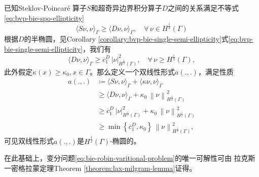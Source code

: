 已知Steklov-Poincaré 算子$S$和超奇异边界积分算子$D$之间的关系满足不等式\eqref{eq:bvp-bie-spo-ellipticity}
\begin{equation*}
  \langle S \nu, \nu \rangle_{\Gamma} \ge \langle D \nu, \nu \rangle_{\Gamma}, \quad \forall \, \nu \in H^{\frac{1}{2}}( \Gamma )
\end{equation*}
根据$D$的半椭圆，见Corollary \ref{corollary:bvp-bie-single-semi-ellipticity}式\eqref{eq:bvp-bie-single-semi-ellipticity}，我们有
\begin{equation*}
  \langle D \nu, \nu \rangle_{\Gamma} \ge \overline{c}_{1}^{D} \,
  \left| \nu \right|_{H^{\frac{1}{2}}(\Gamma)}^{2}, \quad \forall \, \nu \ge H^{\frac{1}{2}}(\Gamma),
\end{equation*}
此外假定$\kappa(x) \ge \kappa_{0}, x \in \Gamma$。那么定义一个双线性形式$a(.,.)$，满足性质
\begin{equation*}
  \begin{split}
    a(.,.) & \coloneqq
    \langle S \nu, \nu \rangle_{\Gamma} + \langle \kappa \nu, \nu \rangle_{\Gamma} \\
     &\ge \langle D \nu, \nu \rangle_{\Gamma} + \kappa_{0} \, \left\| \nu \right\|_{H^{\frac{1}{2}}(\Gamma)}^{2} \\
     &\ge \overline{c}_{1}^{D} \, \left| \nu \right|_{H^{\frac{1}{2}}(\Gamma)}^{2}
     + \kappa_{0} \, \left\| \nu \right\|_{H^{\frac{1}{2}}(\Gamma)}^{2} \\
     & \ge \min \left\{ \overline{c}_{1}^{D}, \kappa_{0} \right\}
     \, \left\| \nu \right\|_{H^{\frac{1}{2}}(\Gamma)}^{2},
  \end{split}
\end{equation*}
可见双线性形式$a(.,.)$是$H^{\frac{1}{2}}(\Gamma)$-椭圆的。

在此基础上，变分问题\eqref{eq:bie-robin-varitional-problem}的唯一可解性可由
拉克斯一密格拉蒙定理Theorem \ref{theorem:lax-milgram-lemma}证得。
